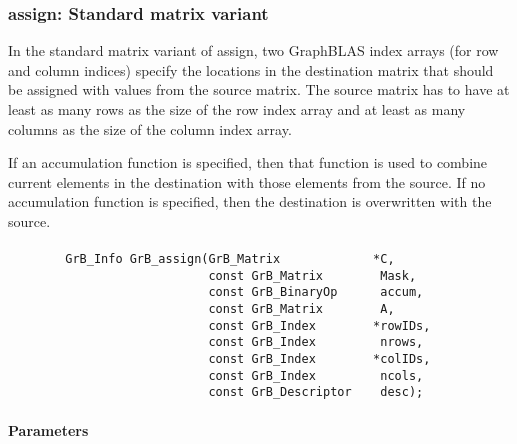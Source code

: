 \subsubsection{{\sf assign}: Standard matrix variant}

In the standard matrix variant of {\sf assign}, two GraphBLAS index arrays (for row and
column indices) specify the locations in the destination matrix that should be 
assigned with values from the source matrix.  The source matrix has to have at least as many 
rows as the size of the row index array and at least as many
columns as the size of the column index array.

If an accumulation function is specified, then that function is used
to combine current elements in the destination with those elements
from the source.  If no accumulation function is specified, then the
destination is overwritten with the source.

\paragraph{\syntax}

\begin{verbatim}
        GrB_Info GrB_assign(GrB_Matrix             *C,
                            const GrB_Matrix        Mask,
                            const GrB_BinaryOp      accum,
                            const GrB_Matrix        A,
                            const GrB_Index        *rowIDs,
                            const GrB_Index         nrows,
                            const GrB_Index        *colIDs,
                            const GrB_Index         ncols,
                            const GrB_Descriptor    desc);
\end{verbatim}

\paragraph{Parameters}

